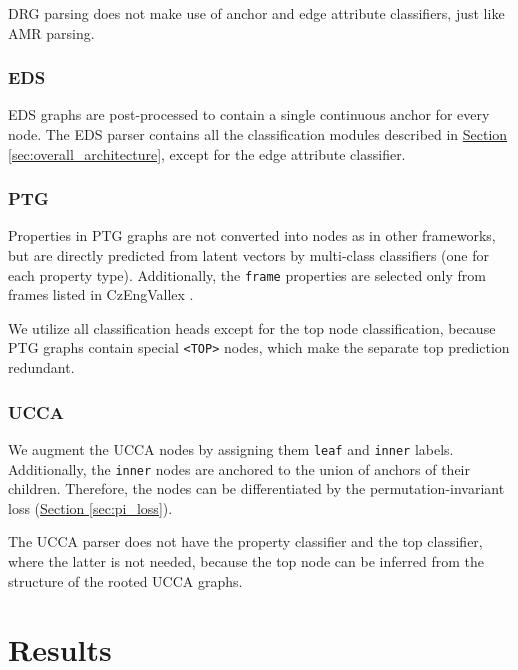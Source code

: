 \documentclass[11pt,a4paper]{article}
\newcommand{\secref}[1]{\hyperref[#1]{Section \ref*{#1}}}
\begin{document}
DRG parsing does not make use of anchor and edge attribute classifiers, just like AMR parsing.


\subsubsection{EDS}
EDS graphs are post-processed to contain a single continuous anchor for every node. The EDS parser contains all the classification modules described in \secref{sec:overall_architecture}, except for the edge attribute classifier.

\subsubsection{PTG}
\label{section:ptg}
Properties in PTG graphs are not converted into nodes as in other frameworks, but are directly predicted from latent vectors  by multi-class classifiers (one for each property type). Additionally, the \texttt{frame} properties are selected only from frames listed in CzEngVallex \cite{uresova2015czengvallex}.

We utilize all classification heads except for the top node classification, because PTG graphs contain special \texttt{<TOP>} nodes, which make the separate top prediction redundant.

\subsubsection{UCCA}

We augment the UCCA nodes by assigning them \texttt{leaf} and \texttt{inner} labels. Additionally, the \texttt{inner} nodes are anchored to the union of anchors of their children. Therefore, the nodes can be differentiated by the permutation-invariant loss (\secref{sec:pi_loss}).

The UCCA parser does not have the property classifier and the top classifier, where the latter is not needed, because the top node can be inferred from the structure of the rooted UCCA graphs. 





 \section{Results}
\end{document}

